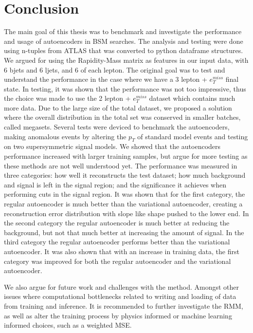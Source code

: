 \chapter{Conclusion}


The main goal of this thesis was to benchmark and investigate the performance and usage of
autoencoders in BSM searches. The analysis and testing were done using 
n-tuples from ATLAS that was converted to python dataframe structures. We argued for using 
the Rapidity-Mass matrix as features in our input data, with 6 bjets and 6 ljets, and 6 
of each lepton. The original goal was to test and understand the performance in the case
where we have a 3 lepton + $e_T^{miss}$ final state. In testing, it was shown that the 
performance was not too impressive, thus the choice was made to use the 2 lepton + $e_T^{miss}$ dataset which 
contains much more data. Due to the large size of the total dataset, we proposed a solution
where the overall distribution in the total set was conserved in smaller batches, called 
megasets. Several tests were deviced to benchmark the autoencoders, 
making anomalous events by altering the $p_T$ of standard model events and testing on two 
supersymmetric signal models. We showed that the autoencoders performance increased with 
larger training samples, but argue for more testing as these methods are not well 
understood yet. The performance was measured in three categories: how well it reconstructs 
the test dataset; how much background and signal is left in the signal region; and 
the significance it achieves when performing cuts in the signal region. It was shown that
for the first category, the regular autoencoder is much better than the variational autoencoder, 
creating a reconstruction error distribution with slope like shape pushed to the lower end. 
In the second category the regular autoencoder is much better at 
reducing the background, but not that much better at increasing the amount of signal. In the 
third category the regular autoencoder performs better than the variational autoencoder. 
It was also shown that with an increase in training data, the first category was improved 
for both the regular autoencoder and the variational autoencoder. \par 
We also argue for future work and challenges with the method. Amongst other 
issues where computational bottlenecks related to writing and loading of data from training 
and inference. It is recommended to further investigate the RMM, as well as alter 
the training process by physics informed or machine learning informed choices, such as a 
weighted MSE. 